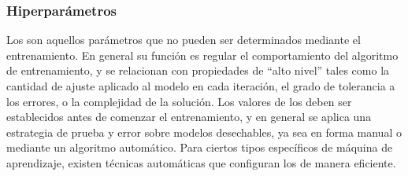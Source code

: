 %
\subsubsection{Hiperparámetros}
%
Los  son aquellos parámetros que no pueden ser determinados
mediante el entrenamiento.
En general su función es regular el comportamiento del algoritmo de
entrenamiento, y se relacionan con propiedades de ``alto nivel'' tales
como la cantidad de ajuste aplicado al modelo en cada iteración,
el grado de tolerancia a los errores, o la complejidad de la solución.
Los valores de los  deben ser establecidos antes de comenzar el
entrenamiento, y en general se aplica una estrategia de prueba y error
sobre modelos desechables, ya sea en forma manual o mediante un
algoritmo automático.
Para ciertos tipos específicos de máquina de aprendizaje, existen técnicas
automáticas que configuran los  de manera eficiente.
